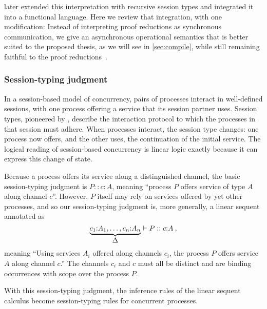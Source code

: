 \Textcite{Toninho+:ESOP13} later extended this interpretation with recursive session types and integrated it into a functional language.
Here we review that integration, with one modification:
Instead of interpreting proof reductions as synchronous communication, we give an asynchronous operational semantics that is better suited to the proposed thesis, as we will see in \cref{sec:compile}, while still remaining faithful to the proof reductions~\autocite{DeYoung+:CSL12}.

\subsubsection{Session-typing judgment}\label{sec:sess-typing-judgm}

In a session-based model of concurrency, pairs of processes interact in well-defined sessions, with one process offering a service that its session partner uses.
Session types, pioneered by \textcite{Honda:CONCUR93}, describe the interaction protocol to which the processes in that session must adhere.
When processes interact, the session type changes: one process now offers, and the other uses, the continuation of the initial service.
The logical reading of session-based concurrency is linear logic exactly because it can express this change of state.

Because a process offers its service along a distinguished channel, the basic session-typing judgment is $P :: c{:}A$, meaning \enquote{process $P$ offers service of type $A$ along channel $c$}.
However, $P$ itself may rely on services offered by yet other processes, and so our session-typing judgment is, more generally, a linear sequent annotated as
\begin{equation*}
  \underbrace{c_1{:}A_1, \dotsc, c_n{:}A_n}_{\displaystyle \Delta} \vdash P :: c{:}A \:,
\end{equation*}
meaning \enquote{Using services $A_i$ offered along channels $c_i$, the process $P$ offers service $A$ along channel $c$.}
The channels $c_i$ and $c$ must all be distinct and are binding occurrences with scope over the process $P$.

With this session-typing judgment, the inference rules of the linear sequent calculus become session-typing rules for concurrent processes.

